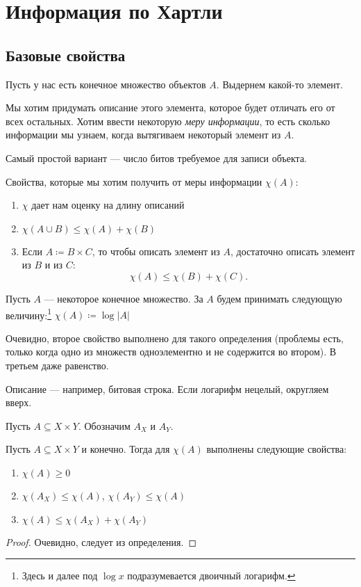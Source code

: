 \chapter{Информация по Хартли}
\section{Базовые свойства}
Пусть у нас есть конечное множество объектов $ A$. Выдернем какой-то элемент.

Мы хотим придумать описание этого элемента, которое будет отличать его от всех остальных. Хотим ввести некоторую \textit{меру информации}, то есть  сколько информации мы узнаем, когда вытягиваем некоторый элемент из $ A$.

Самый простой вариант --- число битов требуемое для записи объекта.

Свойства, которые мы хотим получить от меры информации $ \chi(A)$:
\begin{enumerate}
    \item $ \chi$ дает нам оценку на длину описаний
	\item $ \chi(A \cup B) \le \chi(A) + \chi(B)$
	\item 
Если $ A \coloneqq B \times C$, то чтобы описать элемент из $ A$, достаточно описать элемент из $ B$ и из $ C$:
\[
	\chi(A)  \le \chi(B) + \chi(C)
.\] 
\end{enumerate} 

\begin{defn}
	Пусть $ A$ --- некоторое конечное множество. За   $ A$ будем принимать следующую величину:\footnote{Здесь и далее под $ \log x$ подразумевается двоичный логарифм.}
	$ \chi(A) \coloneqq  \log \lvert A \rvert $
\end{defn}
\begin{note}
Очевидно, второе свойство выполнено для такого определения (проблемы есть, только когда одно из множеств одноэлементно и не содержится во втором). 
В третьем даже равенство. 

Описание --- например, битовая строка. Если логарифм нецелый, округляем вверх.
\end{note}
Пусть $ A  \subseteq X \times Y$. Обозначим  $ A_X$ и $ A_{Y}$.
\begin{figure}[ht]
    \centering
    \label{fig:axy-img}
\end{figure}
\begin{st}
	Пусть $ A \subseteq X\times Y$ и конечно. Тогда для $ \chi(A)$ выполнены следующие свойства:
\begin{enumerate}
	\item $ \chi(A) \ge 0$
	\item $ \chi(A_{X}) \le \chi(A)$, $ \chi(A_{Y}) \le \chi(A)$
	\item $ \chi(A) \le \chi(A_{X}) + \chi(A_{Y})$
\end{enumerate} 
\end{st}
\begin{proof}
    Очевидно, следует из определения.
\end{proof}

